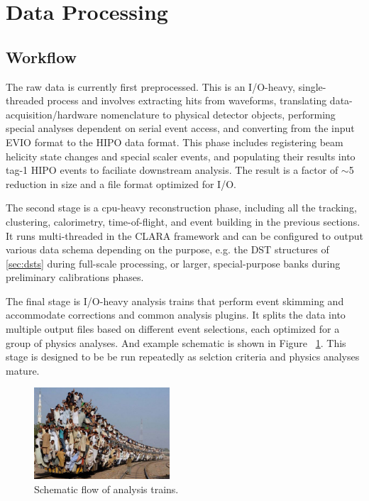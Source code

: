 \section{Data Processing}

\subsection{Workflow}
The raw data is currently first preprocessed.  This is an I/O-heavy, single-threaded process and involves extracting hits from waveforms, translating data-acquisition/hardware nomenclature to physical detector objects, performing special analyses dependent on serial event access, and converting from the input EVIO format to the HIPO data format.  This phase includes registering beam helicity state changes and special scaler events, and populating their results into tag-1 HIPO events to faciliate downstream analysis.  The result is a factor of $\sim$5 reduction in size and a file format optimized for I/O.

The second stage is a cpu-heavy reconstruction phase, including all the tracking, clustering, calorimetry, time-of-flight, and event building in the previous sections.  It runs multi-threaded in the CLARA framework and can be configured to output various data schema depending on the purpose, e.g. the DST structures of \ref{sec:dsts} during full-scale processing, or larger, special-purpose banks during preliminary calibrations phases.

The final stage is I/O-heavy analysis trains that perform event skimming and accommodate corrections and common analysis plugins.  It splits the data into multiple output files based on different event selections, each optimized for a group of physics analyses.  And example schematic is shown in Figure ~\ref{fig:train}.  This stage is designed to be be run repeatedly as selction criteria and physics analyses mature.
\begin{figure}
    \includegraphics[width=0.45\textwidth,height=0.2\textheight]{pics/train.jpg}
    \caption{Schematic flow of analysis trains.\label{fig:train}}
\end{figure}

